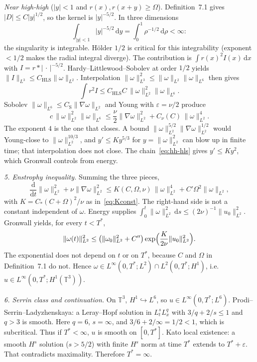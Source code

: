 \documentclass[11pt,a4paper]{article}
\theoremstyle{definition}
\theoremstyle{remark}
\newcommand{\T}{\mathbb{T}}
\newcommand{\abs}[1]{\lvert#1\rvert}
\newcommand{\norm}[1]{\lVert#1\rVert}
\newcommand{\dd}{\mathrm{d}}
\begin{document}
\textit{Near high-high} (\(\abs{y}<1\) and \(r(x),r(x+y)\ge\Omega\)).
Definition~7.1 gives \(\abs{D}\le C\abs{y}^{1/2}\), so the kernel is
\(\abs{y}^{-5/2}\). In three dimensions
\[
\int_{\abs{y}<1}\abs{y}^{-5/2}\,\dd y
=\int_0^1\rho^{-1/2}\,\dd\rho<\infty:
\]
the singularity is integrable. H\"older \(1/2\) is critical for this
integrability (exponent \(<1/2\) makes the radial integral diverge).
The contribution is \(\int r(x)^2 I(x)\,\dd x\) with
\(I=r*\abs{\,\cdot\,}^{-5/2}\). Hardy--Littlewood--Sobolev at order
\(1/2\) yields \(\norm{I}_{L^3}\le C_{\mathrm{HLS}}\norm{\omega}_{L^2}\).
Interpolation \(\norm{\omega}_{L^3}^2\le\norm{\omega}_{L^2}\norm{\omega}_{L^6}\)
then gives
\begin{equation}
\label{eq:hh-hls}
\int r^2 I
\le C_{\mathrm{HLS}}C\,\norm{\omega}_{L^2}^2\norm{\omega}_{L^6}.
\end{equation}
Sobolev \(\norm{\omega}_{L^6}\le C_{\mathrm{S}}\norm{\nabla\omega}_{L^2}\)
and Young with \(\varepsilon=\nu/2\) produce
\[
c\,\norm{\omega}_{L^2}^2\norm{\omega}_{L^6}
\le
\frac\nu2\norm{\nabla\omega}_{L^2}^2
+C_\nu(C)\,\norm{\omega}_{L^2}^4.
\]
The exponent \(4\) is the one that closes. A bound
\(\norm{\omega}_{L^2}^{5/2}\norm{\nabla\omega}_{L^2}^{1/2}\) would
Young-close to \(\norm{\omega}_{L^2}^{10/3}\), and
\(y'\le K y^{5/3}\) for \(y=\norm{\omega}_{L^2}^2\) can blow up in finite
time; that interpolation does not close. The chain~\eqref{eq:hh-hls} gives
\(y'\le K y^2\), which Gronwall controls from energy.

\textit{5. Enstrophy inequality.}
Summing the three pieces,
\begin{equation}
\label{eq:enst-closed}
\frac{\dd}{\dd t}\norm{\omega}_{L^2}^2
+\nu\norm{\nabla\omega}_{L^2}^2
\le K(C,\Omega,\nu)\,\norm{\omega}_{L^2}^4
+C'\Omega^2\norm{\omega}_{L^2},
\end{equation}
with \(K=C_\ast(C+\Omega)^2/\nu\) as in~\eqref{eq:Kconst}.
The right-hand side is not a constant independent of \(\omega\).
Energy supplies
\(\int_0^t\norm{\omega}_{L^2}^2\,\dd s\le(2\nu)^{-1}\norm{u_0}_{L^2}^2\).
Gronwall yields, for every \(t<T^*\),
\[
\norm{\omega(t)}_{L^2}^2
\le
\bigl(\norm{\omega_0}_{L^2}^2+C''\bigr)
\exp\Bigl(\frac{K}{2\nu}\norm{u_0}_{L^2}^2\Bigr).
\]
The exponential does not depend on \(t\) or on \(T^*\), because \(C\)
and \(\Omega\) in Definition~7.1 do not. Hence
\(\omega\in L^\infty(0,T^*;L^2)\cap L^2(0,T^*;H^1)\), i.e.
\(u\in L^\infty(0,T^*;H^1(\T^3))\).

\textit{6. Serrin class and continuation.}
On \(\T^3\), \(H^1\hookrightarrow L^6\), so
\(u\in L^\infty(0,T^*;L^6)\). Prodi--Serrin--Ladyzhenskaya: a Leray--Hopf
solution in \(L^s_t L^q_x\) with \(3/q+2/s\le 1\) and \(q>3\) is smooth.
Here \(q=6\), \(s=\infty\), and \(3/6+2/\infty=1/2<1\), which is
subcritical. Thus if \(T^*<\infty\), \(u\) is smooth on \([0,T^*]\).
Kato local existence: a smooth \(H^s\) solution (\(s>5/2\)) with finite
\(H^s\) norm at time \(T^*\) extends to \(T^*+\varepsilon\). That
contradicts maximality. Therefore \(T^*=\infty\).
\end{document}
